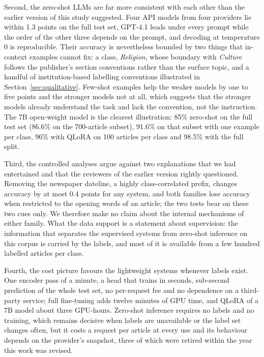 \documentclass[preprint,12pt,authoryear]{elsarticle}
\newif\ifrevmarkup
\DeclareRobustCommand{\rev}[1]{\ifrevmarkup{\color{blue}#1}\else#1\fi}
\begin{document}
Second, the zero-shot LLMs are far more consistent with each other than the earlier version of this study suggested. Four API models from four providers lie within 1.3 points on the full test set, GPT-4.1 leads under every prompt while the order of the other three depends on the prompt, and decoding at temperature 0 is reproducible. \rev{Their accuracy is nevertheless bounded by two things that in-context examples cannot fix: a class, \textit{Religion}, whose boundary with \textit{Culture} follows the publisher's section conventions rather than the surface topic, and a handful of institution-based labelling conventions illustrated in Section~\ref{sec:qualitative}.} \rev{Few-shot examples help the weaker models by one to five points and the stronger models not at all, which suggests that the stronger models already understand the task and lack the convention, not the instruction.} \rev{The 7B open-weight model is the clearest illustration: 85\% zero-shot on the full test set (86.6\% on the 700-article subset), 91.6\% on that subset with one example per class, 96\% with QLoRA on 100 articles per class and 98.5\% with the full split.}

\rev{Third, the controlled analyses argue against two explanations that we had entertained and that the reviewers of the earlier version rightly questioned. Removing the newspaper dateline, a highly class-correlated prefix, changes accuracy by at most 0.4 points for any system, and both families lose accuracy when restricted to the opening words of an article; the two tests bear on these two cues only. We therefore make no claim about the internal mechanisms of either family. What the data support is a statement about supervision: the information that separates the supervised systems from zero-shot inference on this corpus is carried by the labels, and most of it is available from a few hundred labelled articles per class.}

Fourth, the cost picture favours the lightweight systems whenever labels exist. One encoder pass of a minute, a head that trains in seconds, sub-second prediction of the whole test set, no per-request fee and no dependence on a third-party service; full fine-tuning adds twelve minutes of GPU time, and QLoRA of a 7B model about three GPU-hours. Zero-shot inference requires no labels and no training, which remains decisive when labels are unavailable or the label set changes often, but it costs a request per article at every use and its behaviour depends on the provider's snapshot, three of which were retired within the year this work was revised.
\end{document}
